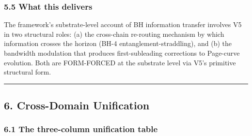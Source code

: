 \documentclass[
  11pt,
  a4paperpaper,
]{article}
\begin{document}
\subsubsection{5.5 What this delivers}\label{what-this-delivers-2}

The framework's substrate-level account of BH information transfer
involves V5 in two structural roles: (a) the cross-chain re-routing
mechanism by which information crosses the horizon (BH-4
entanglement-straddling), and (b) the bandwidth modulation that produces
first-subleading corrections to Page-curve evolution. Both are
FORM-FORCED at the substrate level via V5's primitive structural form.

\begin{center}\rule{0.5\linewidth}{0.5pt}\end{center}

\subsection{6. Cross-Domain Unification}\label{cross-domain-unification}

\subsubsection{6.1 The three-column unification
table}\label{the-three-column-unification-table}
\end{document}
